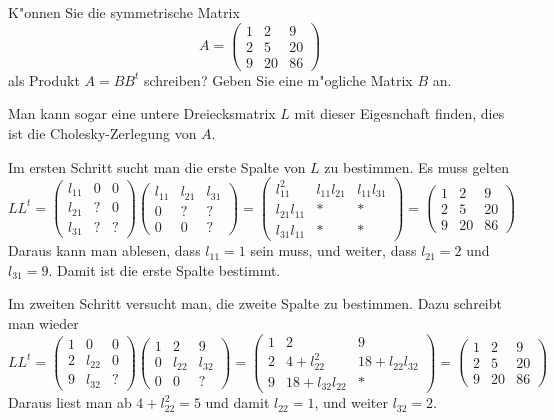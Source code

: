 K"onnen Sie die symmetrische Matrix
\[
A=\begin{pmatrix}
1& 2& 9\\
2& 5&20\\
9&20&86
\end{pmatrix}
\]
als Produkt $A=BB^t$ schreiben? Geben Sie eine m"ogliche Matrix $B$ an.

\begin{loesung}
Man kann sogar eine untere Dreiecksmatrix $L$ mit dieser Eigesnchaft finden,
dies ist die Cholesky-Zerlegung von $A$.

Im ersten Schritt sucht man die erste Spalte von $L$ zu bestimmen.
Es muss gelten
\[
LL^t=
\begin{pmatrix}
l_{11}&  0&  0\\
l_{21}&  ?&  0\\
l_{31}&  ?&  ?
\end{pmatrix}
\begin{pmatrix}
l_{11}&l_{21}&l_{31}\\
     0&     ?&     ?\\
     0&     0&     ?
\end{pmatrix}
=
\begin{pmatrix}
    l_{11}^2&l_{11}l_{21}&l_{11}l_{31}\\
l_{21}l_{11}&           *&           *\\
l_{31}l_{11}&           *&           *
\end{pmatrix}
=
\begin{pmatrix}
1& 2& 9\\
2& 5&20\\
9&20&86
\end{pmatrix}
\]
Daraus kann man ablesen, dass $l_{11}=1$ sein muss, und weiter,
dass
$l_{21}=2$ und $l_{31}=9$. Damit ist die erste Spalte bestimmt.

Im zweiten Schritt versucht man, die zweite Spalte zu bestimmen.
Dazu schreibt man wieder
\[
LL^t
=
\begin{pmatrix}
1&     0&0\\
2&l_{22}&0\\
9&l_{32}&?
\end{pmatrix}
\begin{pmatrix}
1&     2&     9\\
0&l_{22}&l_{32}\\
0&     0&?
\end{pmatrix}
=
\begin{pmatrix}
1&2           &           9\\
2&4+l_{22}^2  &18+l_{22}l_{32}\\
9&18+l_{32}l_{22}&         *
\end{pmatrix}
=
\begin{pmatrix}
1& 2& 9\\
2& 5&20\\
9&20&86
\end{pmatrix}
\]
Daraus liest man ab $4+l_{22}^2=5$ und damit $l_{22}=1$, und weiter
$l_{32}=2$.


\end{loesung}

